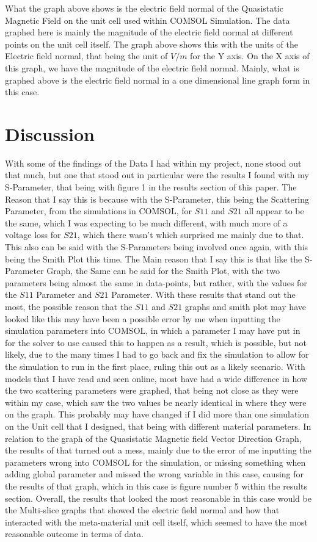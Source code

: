 \documentclass[]{article}
\begin{document}
\noindent
What the graph above shows is the electric field normal of the Quasistatic Magnetic Field on the unit cell used within COMSOL Simulation. The data graphed here is mainly the magnitude of the electric field normal at different points on the unit cell itself. The graph above shows this with the units of the Electric field normal, that being the unit of $V/m$ for the Y axis. On the X axis of this graph, we have the magnitude of the electric field normal. Mainly, what is graphed above is the electric field normal in a one dimensional line graph form in this case. 
\section*{Discussion}
With some of the findings of the Data I had within my project, none stood out that much, but one that stood out in particular were the results I found with my S-Parameter, that being with figure 1 in the results section of this paper. The Reason that I say this is because with the S-Parameter, this being the Scattering Parameter, from the simulations in COMSOL, for $S11$ and $S21$ all appear to be the same, which I was expecting to be much different, with much more of a voltage loss for $S21$, which there wasn't which surprised me mainly due to that. This also can be said with the S-Parameters being involved once again, with this being the Smith Plot this time. The Main reason that I say this is that like the S-Parameter Graph, the Same can be said for the Smith Plot, with the two parameters being almost the same in data-points, but rather, with the values for the $S11$ Parameter and $S21$ Parameter. With these results that stand out the most, the possible reason that the $S11$ and $S21$ graphs and smith plot may have looked like this may have been a possible error by me when inputting the simulation parameters into COMSOL, in which a parameter I may have put in for the solver to use caused this to happen as a result, which is possible, but not likely, due to the many times I had to go back and fix the simulation to allow for the simulation to run in the first place, ruling this out as a likely scenario. With models that I have read and seen online, most have had a wide difference in how the two scattering parameters were graphed, that being not close as they were within my case, which saw the two values be nearly identical in where they were on the graph. This probably may have changed if I did more than one simulation on the Unit cell that I designed, that being with different material parameters. In relation to the graph of the Quasistatic Magnetic field Vector Direction Graph, the results of that turned out a mess, mainly due to the error of me inputting the parameters wrong into COMSOL for the simulation, or missing something when adding global parameter and missed the wrong variable in this case, causing for the results of that graph, which in this case is figure number 5 within the results section. Overall, the results that looked the most reasonable in this case would be the Multi-slice graphs that showed the electric field normal and how that interacted with the meta-material unit cell itself, which seemed to have the most reasonable outcome in terms of data.
\end{document}
